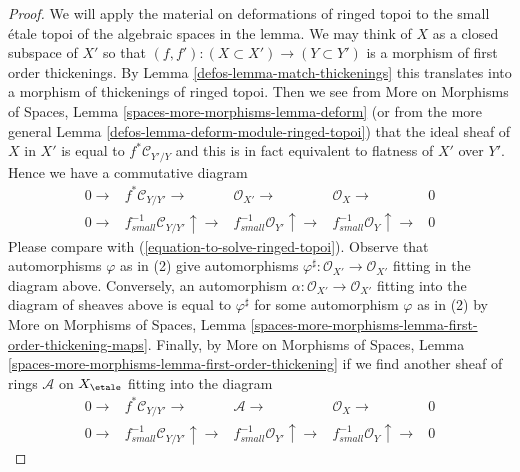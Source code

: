 \begin{proof}

We will apply the material on deformations of ringed topoi
to the small \'etale topoi of the algebraic spaces in the lemma.
We may think of $X$ as a closed subspace of $X'$
so that $(f, f') : (X \subset X') \to (Y \subset Y')$
is a morphism of first order thickenings.
By Lemma \ref{defos-lemma-match-thickenings}
this translates into a morphism of thickenings of ringed topoi.
Then we see from More on Morphisms of Spaces, Lemma
\ref{spaces-more-morphisms-lemma-deform}
(or from the more general Lemma \ref{defos-lemma-deform-module-ringed-topoi})
that the ideal sheaf of $X$ in $X'$ is equal to $f^*\mathcal{C}_{Y'/Y}$
and this is in fact equivalent to flatness of $X'$ over $Y'$.
Hence we have a commutative diagram
$$
\begin{array}{ccccc}0 \longrightarrow & f^*\mathcal{C}_{Y/Y'} \longrightarrow & \mathcal{O}_{X'} \longrightarrow & \mathcal{O}_X \longrightarrow & 0 \\ 0 \longrightarrow & f_{small}^{-1}\mathcal{C}_{Y/Y'} \uparrow\longrightarrow & f_{small}^{-1}\mathcal{O}_{Y'} \uparrow\longrightarrow & f_{small}^{-1}\mathcal{O}_Y \uparrow\longrightarrow & 0\end{array}
$$
Please compare with (\ref{equation-to-solve-ringed-topoi}).
Observe that automorphisms $\varphi$ as in (2)
give automorphisms $\varphi^\sharp : \mathcal{O}_{X'} \to \mathcal{O}_{X'}$
fitting in the diagram above. Conversely, an automorphism
$\alpha : \mathcal{O}_{X'} \to \mathcal{O}_{X'}$
fitting into the diagram of sheaves above is equal to $\varphi^\sharp$
for some automorphism $\varphi$ as in (2)
by More on Morphisms of Spaces, Lemma
\ref{spaces-more-morphisms-lemma-first-order-thickening-maps}.
Finally, by More on Morphisms of Spaces, Lemma
\ref{spaces-more-morphisms-lemma-first-order-thickening}
if we find another sheaf of rings $\mathcal{A}$ on $X_\etale$
fitting into the diagram
$$
\begin{array}{ccccc}0 \longrightarrow & f^*\mathcal{C}_{Y/Y'} \longrightarrow & \mathcal{A} \longrightarrow & \mathcal{O}_X \longrightarrow & 0 \\ 0 \longrightarrow & f_{small}^{-1}\mathcal{C}_{Y/Y'} \uparrow\longrightarrow & f_{small}^{-1}\mathcal{O}_{Y'} \uparrow\longrightarrow & f_{small}^{-1}\mathcal{O}_Y \uparrow\longrightarrow & 0\end{array}
$$
\end{proof}
